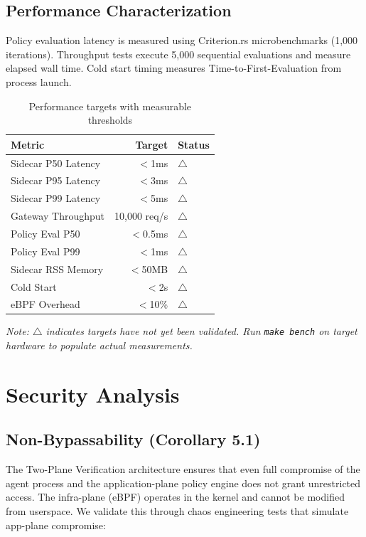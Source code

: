 \documentclass[runningheads]{llncs}
\begin{document}
\subsection{Performance Characterization}

Policy evaluation latency is measured using Criterion.rs microbenchmarks (1,000 iterations). Throughput tests execute 5,000 sequential evaluations and measure elapsed wall time. Cold start timing measures Time-to-First-Evaluation from process launch.

\begin{table}[H]
\centering
\caption{Performance targets with measurable thresholds}
\begin{tabular}{lrl}
\toprule
Metric & Target & Status \\
\midrule
Sidecar P50 Latency & $<$1ms & $\triangle$ \\
Sidecar P95 Latency & $<$3ms & $\triangle$ \\
Sidecar P99 Latency & $<$5ms & $\triangle$ \\
Gateway Throughput & 10,000 req/s & $\triangle$ \\
Policy Eval P50 & $<$0.5ms & $\triangle$ \\
Policy Eval P99 & $<$1ms & $\triangle$ \\
Sidecar RSS Memory & $<$50MB & $\triangle$ \\
Cold Start & $<$2s & $\triangle$ \\
eBPF Overhead & $<$10\% & $\triangle$ \\
\bottomrule
\end{tabular}
\end{table}

\emph{Note: $\triangle$ indicates targets have not yet been validated. Run \texttt{make bench} on target hardware to populate actual measurements.}

\section{Security Analysis}

\subsection{Non-Bypassability (Corollary 5.1)}

The Two-Plane Verification architecture ensures that even full compromise of the agent process and the application-plane policy engine does not grant unrestricted access. The infra-plane (eBPF) operates in the kernel and cannot be modified from userspace. We validate this through chaos engineering tests that simulate app-plane compromise:
\end{document}
